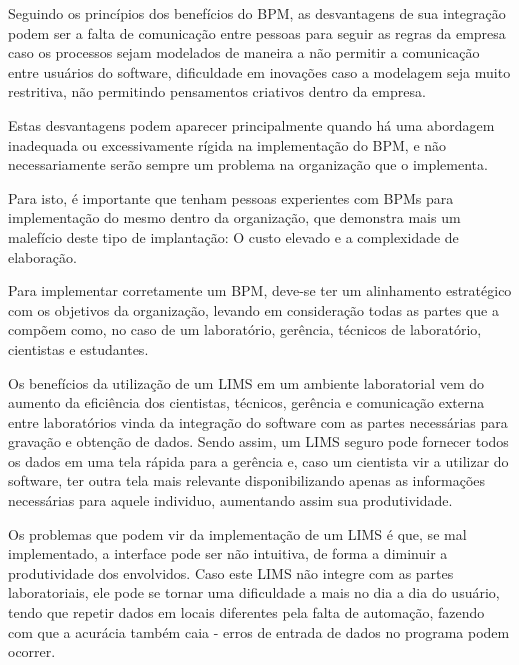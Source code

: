 Seguindo os princípios dos benefícios do BPM, as desvantagens de sua integração podem ser a falta de comunicação entre pessoas para seguir as regras da empresa caso os processos sejam modelados de maneira a não permitir a comunicação entre usuários do software, dificuldade em inovações caso a modelagem seja muito restritiva, não permitindo pensamentos criativos dentro da empresa.

Estas desvantagens podem aparecer principalmente quando há uma abordagem inadequada ou excessivamente rígida na implementação do BPM, e não necessariamente serão sempre um problema na organização que o implementa.

Para isto, é importante que tenham pessoas experientes com BPMs para implementação do mesmo dentro da organização, que demonstra mais um malefício deste tipo de implantação: O custo elevado e a complexidade de elaboração.

Para implementar corretamente um BPM, deve-se ter um alinhamento estratégico com os objetivos da organização, levando em consideração todas as partes que a compõem como, no caso de um laboratório, gerência, técnicos de laboratório, cientistas e estudantes.



Os benefícios da utilização de um LIMS em um ambiente laboratorial vem do aumento da eficiência dos cientistas, técnicos, gerência e comunicação externa entre laboratórios vinda da integração do software com as partes necessárias para gravação e obtenção de dados. Sendo assim, um LIMS seguro pode fornecer todos os dados em uma tela rápida para a gerência e, caso um cientista vir a utilizar do software, ter outra tela mais relevante disponibilizando apenas as informações necessárias para aquele individuo, aumentando assim sua produtividade.


Os problemas que podem vir da implementação de um LIMS é que, se mal implementado, a interface pode ser não intuitiva, de forma a diminuir a produtividade dos envolvidos. Caso este LIMS não integre com as partes laboratoriais, ele pode se tornar uma dificuldade a mais no dia a dia do usuário, tendo que repetir dados em locais diferentes pela falta de automação, fazendo com que a acurácia também caia - erros de entrada de dados no programa podem ocorrer.

